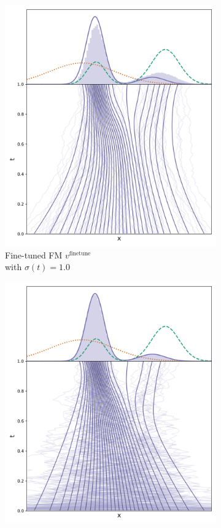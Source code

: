\documentclass[]{fairmeta}
\begin{document}
\begin{figure}
\begin{subfigure}[t]{0.25\linewidth}
        \includegraphics[width=\linewidth]{figs/finetune1d/finetuned_biased_1.0_model.png}
        \caption{Fine-tuned FM $v^\mathrm{finetune}$\\ with $\sigma(t) = 1.0$}
    \end{subfigure}%
    \begin{subfigure}[t]{0.25\linewidth}
        \centering
        \includegraphics[width=\linewidth]{figs/finetune1d/finetuned_model.png}

\end{subfigure}
\end{figure}
\end{document}
